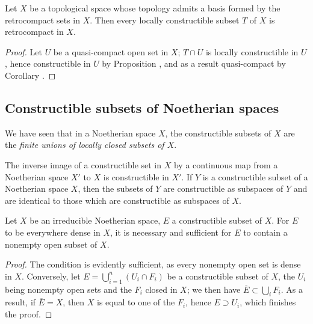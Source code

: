 \begin{cor}[9.1.13]
\label{0.9.1.13}
Let $X$ be a topological space whose topology admits a basis formed by the retrocompact sets in $X$.
Then every locally constructible subset $T$ of $X$ is retrocompact in $X$.
\end{cor}

\begin{proof}
\label{proof-0.9.1.13}
Let $U$ be a quasi-compact open set in $X$; $T\cap U$ is locally constructible in $U$, hence constructible in $U$ by Proposition , and as a result quasi-compact by Corollary .
\end{proof}

\subsection{Constructible subsets of Noetherian spaces}
\label{subsection:constructible-subsets-of-noetherian-spaces}

\begin{env}[9.2.1]
\label{0.9.2.1}
We have seen  that in a Noetherian space $X$, the constructible subsets of $X$ are the \emph{finite unions of locally closed subsets of $X$}.

The inverse image of a constructible set in $X$ by a continuous map from a Noetherian space $X'$ to $X$ is constructible in $X'$.
If $Y$ is a constructible subset of a Noetherian space $X$, then the subsets of $Y$ are constructible as subspaces of $Y$ and are identical to those which are constructible as subspaces of $X$.
\end{env}

\begin{prop}[9.2.2]
\label{0.9.2.2}
Let $X$ be an irreducible Noetherian space, $E$ a constructible subset of $X$.
For $E$ to be everywhere dense in $X$, it is necessary and sufficient for $E$ to contain a nonempty open subset of $X$.
\end{prop}

\begin{proof}
\label{proof-0.9.2.2}
The condition is evidently sufficient, as every nonempty open set is dense in $X$.
Conversely, let $E=\bigcup_{i=1}^n(U_i\cap F_i)$ be a constructible subset of $X$, the $U_i$ being nonempty open sets and the $F_i$ closed in $X$; we then have $\overline{E}\subset\bigcup_i F_i$.
As a result, if $\overline{E}=X$, then $X$ is equal to one of the $F_i$, hence $E\supset U_i$, which finishes the proof.
\end{proof}

